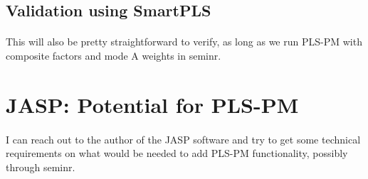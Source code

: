 \documentclass{article}
\begin{document}
\subsection{Validation using SmartPLS}

\paragraph{}
This will also be pretty straightforward to verify, as long as we run PLS-PM with composite factors and mode A weights in seminr.

\section{JASP: Potential for PLS-PM}

\paragraph{}
I can reach out to the author of the JASP software and try to get some technical requirements on what would be needed to add PLS-PM functionality, possibly through seminr.
\end{document}
